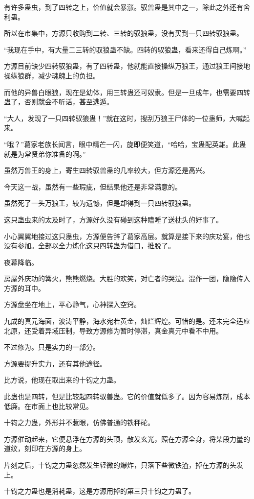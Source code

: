 \begin{this_body}
有许多蛊虫，到了四转之上，价值就会暴涨。驭兽蛊是其中之一，除此之外还有舍利蛊。

所以在市集中，方源只收购到二转、三转的驭狼蛊，没有买到一只四转驭狼蛊。

“我现在手中，有大量二三转的驭狼蛊不缺。四转的驭狼蛊，看来还得自己炼啊。”

方源目前缺少四转驭狼蛊，有了四转蛊，他就能直接操纵万狼王，通过狼王间接地操纵狼群，减少魂魄上的负担。

而他的异兽白眼狼，现在是幼体，用三转蛊还可奴隶。但是一旦成年，也需要四转蛊了，否则就会不听话，甚至逃遁。

“大人，发现了一只四转驭狼蛊！”就在这时，搜刮万狼王尸体的一位蛊师，大喊起来。

“哦？”葛家老族长闻言，眼中精芒一闪，旋即便笑道，“哈哈，宝蛊配英雄。此蛊就是为常贤弟你准备的啊。”

虽然万兽王的身上，寄生四转驭兽蛊的几率较大，但方源还是高兴。

今天这一战，虽然有一些瑕疵，但结果他还是非常满意的。

虽然死了一头万狼王，较为遗憾，但是却得到一只四转驭狼蛊。

这只蛊虫来的太及时了，方源好久没有碰到这种瞌睡了送枕头的好事了。

小心翼翼地接过这只蛊虫，方源便告辞了葛家高层。就算是接下来的庆功宴，他也没有参加。全部以全力炼化这只四转蛊为借口，推脱了。

夜幕降临。

房屋外庆功的篝火，熊熊燃烧。大胜的欢笑，对亡者的哭泣。混作一团，隐隐传入方源的耳中。

方源盘坐在地上，平心静气，心神探入空窍。

九成的真元海面，波涛平静，海水宛若黄金，灿烂辉煌。可惜的是。还未完全适应北原，还受着异域压制，导致方源修为暂时停滞，真金真元中看不中用。

不过修为。只是实力的一部分。

方源要提升实力，还有其他途径。

比方说，他现在取出来的十钧之力蛊。

此蛊也是四转，但是比较起四转驭兽蛊。它的价值就低多了。因为容易炼制，成本低廉。在市面上也比较常见。

十钧之力蛊，外形并不惹眼，仿佛普通的铁秤砣。

方源催动起来，它便悬浮在方源的头顶，散发玄光，照在方源全身，将某段力量的道纹，刻印在方源的身上。

片刻之后，十钧之力蛊忽然发生轻微的爆炸，只落下些微铁渣，掉在方源的头发上。

十钧之力蛊也是消耗蛊，这是方源用掉的第三只十钧之力蛊了。


\end{this_body}
